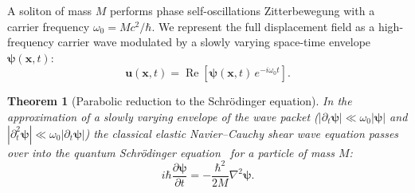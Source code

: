 \documentclass[11pt,a4paper]{article}
\newtheorem{theorem}{Theorem}
\theoremstyle{definition}
\theoremstyle{remark}
\begin{document}
A soliton of mass $M$ performs phase self-oscillations Zitterbewegung with a carrier frequency $\omega_0 = M c^2 / \hbar$. We represent the full displacement field as a high-frequency carrier wave modulated by a slowly varying space-time envelope $\boldsymbol{\psi}(\mathbf{x}, t)$:
\begin{equation}
\mathbf{u}(\mathbf{x}, t) = \operatorname{Re}\left[ \boldsymbol{\psi}(\mathbf{x}, t) \, e^{-i \omega_0 t} \right].
\label{eq:envelope_ansatz}
\end{equation}

\begin{theorem}[Parabolic reduction to the Schrödinger equation]
\label{thm:schroedinger_derivation}
In the approximation of a slowly varying envelope of the wave packet ($|\partial_t \boldsymbol{\psi}| \ll \omega_0 |\boldsymbol{\psi}|$ and $|\partial_t^2 \boldsymbol{\psi}| \ll \omega_0 |\partial_t \boldsymbol{\psi}|$) the classical elastic Navier--Cauchy shear wave equation passes over into the quantum Schrödinger equation~\cite{Schrodinger1926} for a particle of mass $M$:
\begin{equation}
	i\hbar \frac{\partial \boldsymbol{\psi}}{\partial t} = -\frac{\hbar^2}{2M} \nabla^2 \boldsymbol{\psi}.
	\label{eq:schroedinger_exact}
\end{equation}
\end{theorem}
\end{document}
